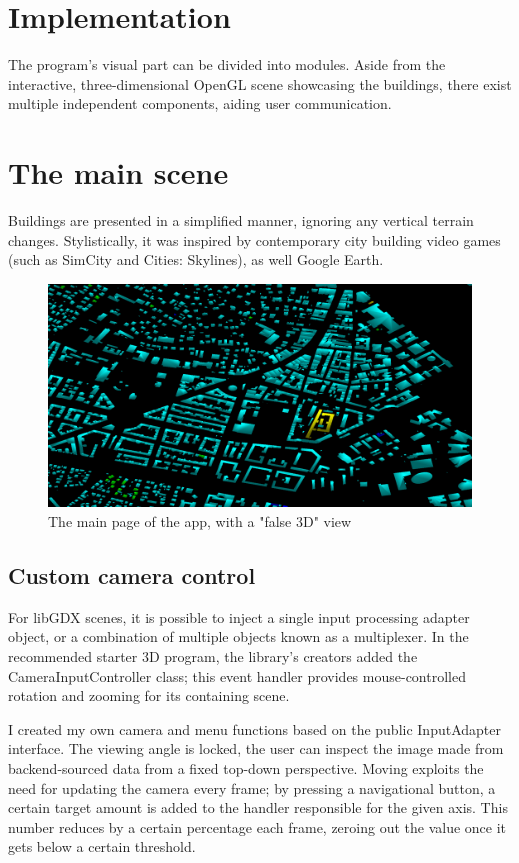 \section{Implementation}
The program's visual part can be divided into modules. Aside from the interactive, three-dimensional OpenGL scene showcasing the buildings, there exist multiple independent components, aiding user communication.

\section{The main scene}
Buildings are presented in a simplified manner, ignoring any vertical terrain changes. Stylistically, it was inspired by contemporary city building video games (such as SimCity and Cities: Skylines), as well Google Earth.

\begin{figure}[!ht]
    \centering
    \includegraphics[width=150mm, keepaspectratio]{images/main_graphics_view.png}
    \caption{The main page of the app, with a "false 3D" view}
\end{figure}

\subsection{Custom camera control}

For libGDX scenes, it is possible to inject a single input processing adapter object, or a combination of multiple objects known as a multiplexer. In the recommended starter 3D program\cite{basic3DlibGDX}, the library's creators added the CameraInputController class; this event handler provides mouse-controlled rotation and zooming for its containing scene.

I created my own camera and menu functions based on the public InputAdapter interface. The viewing angle is locked, the user can inspect the image made from backend-sourced data from a fixed top-down perspective. Moving exploits the need for updating the camera every frame; by pressing a navigational button, a certain target amount is added to the handler responsible for the given axis. This number reduces by a certain percentage each frame, zeroing out the value once it gets below a certain threshold.

